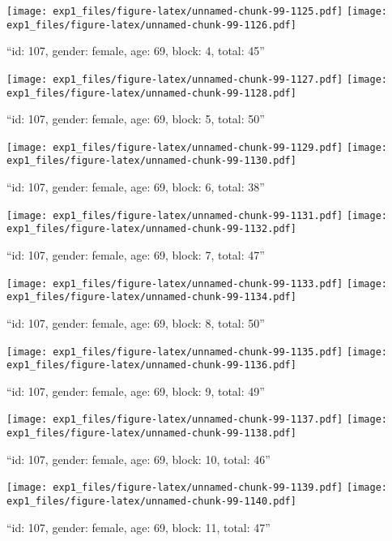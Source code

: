 \documentclass[,]{article}
\begin{document}
\texttt{[image: exp1\_files/figure-latex/unnamed-chunk-99-1125.pdf]}
\texttt{[image: exp1\_files/figure-latex/unnamed-chunk-99-1126.pdf]}

\newpage
[1] 

``id: 107, gender: female, age: 69, block: 4, total: 45''

\texttt{[image: exp1\_files/figure-latex/unnamed-chunk-99-1127.pdf]}
\texttt{[image: exp1\_files/figure-latex/unnamed-chunk-99-1128.pdf]}

\newpage
[1] 

``id: 107, gender: female, age: 69, block: 5, total: 50''

\texttt{[image: exp1\_files/figure-latex/unnamed-chunk-99-1129.pdf]}
\texttt{[image: exp1\_files/figure-latex/unnamed-chunk-99-1130.pdf]}

\newpage
[1] 

``id: 107, gender: female, age: 69, block: 6, total: 38''

\texttt{[image: exp1\_files/figure-latex/unnamed-chunk-99-1131.pdf]}
\texttt{[image: exp1\_files/figure-latex/unnamed-chunk-99-1132.pdf]}

\newpage
[1] 

``id: 107, gender: female, age: 69, block: 7, total: 47''

\texttt{[image: exp1\_files/figure-latex/unnamed-chunk-99-1133.pdf]}
\texttt{[image: exp1\_files/figure-latex/unnamed-chunk-99-1134.pdf]}

\newpage
[1] 

``id: 107, gender: female, age: 69, block: 8, total: 50''

\texttt{[image: exp1\_files/figure-latex/unnamed-chunk-99-1135.pdf]}
\texttt{[image: exp1\_files/figure-latex/unnamed-chunk-99-1136.pdf]}

\newpage
[1] 

``id: 107, gender: female, age: 69, block: 9, total: 49''

\texttt{[image: exp1\_files/figure-latex/unnamed-chunk-99-1137.pdf]}
\texttt{[image: exp1\_files/figure-latex/unnamed-chunk-99-1138.pdf]}

\newpage
[1] 

``id: 107, gender: female, age: 69, block: 10, total: 46''

\texttt{[image: exp1\_files/figure-latex/unnamed-chunk-99-1139.pdf]}
\texttt{[image: exp1\_files/figure-latex/unnamed-chunk-99-1140.pdf]}

\newpage
[1] 

``id: 107, gender: female, age: 69, block: 11, total: 47''
\end{document}
